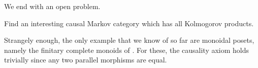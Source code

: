 \documentclass[11pt]{article}
\begin{document}
We end with an open problem.

\begin{problem}
	Find an interesting causal Markov category which has all Kolmogorov products.
\end{problem}

Strangely enough, the only example that we know of so far are monoidal posets, namely the finitary complete monoids of . For these, the causality axiom holds trivially since any two parallel morphisms are equal.



\end{document}
